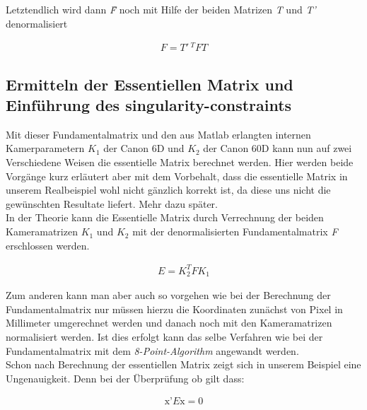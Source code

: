Letztendlich wird dann \textit{\^F} noch mit Hilfe der beiden Matrizen \textit{T} und \textit{T'} denormalisiert 

\begin{gather}
F = T'\,^T\textit{\^F}T
\end{gather}
\subsection{Ermitteln der Essentiellen Matrix und Einführung des singularity-constraints}

Mit dieser Fundamentalmatrix und den aus Matlab erlangten internen Kamerparametern \ensuremath{K_1} der Canon 6D und \ensuremath{K_2} der Canon 60D kann nun auf zwei Verschiedene Weisen die essentielle Matrix berechnet werden. Hier werden beide Vorgänge kurz erläutert aber mit dem Vorbehalt, dass die essentielle Matrix in unserem Realbeispiel wohl nicht gänzlich korrekt ist, da diese uns nicht die gewünschten Resultate liefert. Mehr dazu später.\\

In der Theorie kann die Essentielle Matrix durch Verrechnung der beiden Kameramatrizen \ensuremath{K_1} und \ensuremath{K_2} mit der denormalisierten Fundamentalmatrix \textit{F} erschlossen werden.

\begin{gather}
E = K_2^TFK_1
\end{gather} 

Zum anderen kann man aber auch so vorgehen wie bei der Berechnung der Fundamentalmatrix nur müssen hierzu die Koordinaten zunächst von Pixel in Millimeter umgerechnet werden und danach noch mit den Kameramatrizen normalisiert werden. Ist dies erfolgt kann das selbe Verfahren wie bei der Fundamentalmatrix mit dem \textit{8-Point-Algorithm} angewandt werden.\\

Schon nach Berechnung der essentiellen Matrix zeigt sich in unserem Beispiel eine Ungenauigkeit. Denn bei der Überprüfung ob gilt dass:

\begin{gather}
\text{\^x'}E\text{\^x} = 0
\end{gather}\\

